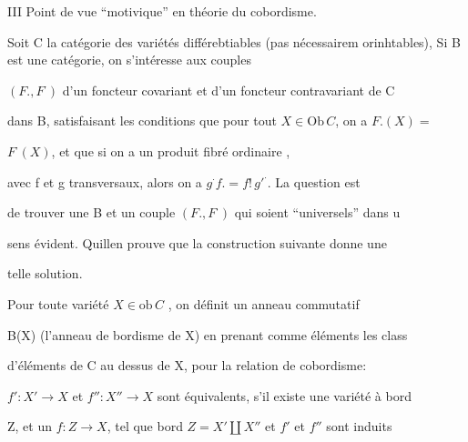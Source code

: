 
III Point de vue ``motivique'' en théorie du cobordisme.

Soit C la catégorie des variétés différebtiables (pas nécessairem
orinhtables),  Si B est une catégorie, on s'intéresse aux couples

$(F.,F^{\cdot})$ d'un foncteur covariant et d'un foncteur contravariant de C

dans B, satisfaisant les conditions que pour tout $X\in \mathrm{Ob}\, C$, on a $F.(X)=$

$F^{\cdot}(X)$, et que si on a un produit fibré ordinaire
,

avec f et g transversaux, alors on a $g^{\cdot}f. = f!\, g'^{\cdot}$. La question est

de trouver une B et un couple $(F.,F^{\cdot})$ qui soient ``universels'' dans u

sens évident. Quillen prouve que la construction suivante donne une

telle solution.

Pour toute variété $X\in \mathrm{ob}\, C$ , on définit un anneau commutatif

B(X) (l'anneau de bordisme de X) en prenant comme éléments les class

 d'éléments de C au dessus de X, pour la relation de cobordisme:

$f'{:}X'\to X$ et $f''{:}X''\to X$ sont équivalents, s'il existe une variété à bord

Z, et un $f{:}Z\to X$, tel que bord $Z = X'\amalg X''$ et $f'$ et $f''$ sont induits

